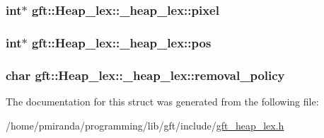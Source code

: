\subsubsection[{\texorpdfstring{pixel}{pixel}}]{\setlength{\rightskip}{0pt plus 5cm}int$\ast$ gft\+::\+Heap\+\_\+lex\+::\+\_\+heap\+\_\+lex\+::pixel}\hypertarget{structgft_1_1Heap__lex_1_1__heap__lex_ad0959c04c1544378684b566f6d2cbe8c}{}\label{structgft_1_1Heap__lex_1_1__heap__lex_ad0959c04c1544378684b566f6d2cbe8c}
\subsubsection[{\texorpdfstring{pos}{pos}}]{\setlength{\rightskip}{0pt plus 5cm}int$\ast$ gft\+::\+Heap\+\_\+lex\+::\+\_\+heap\+\_\+lex\+::pos}\hypertarget{structgft_1_1Heap__lex_1_1__heap__lex_a5930686532a650d25969bba672e88d35}{}\label{structgft_1_1Heap__lex_1_1__heap__lex_a5930686532a650d25969bba672e88d35}
\subsubsection[{\texorpdfstring{removal\+\_\+policy}{removal_policy}}]{\setlength{\rightskip}{0pt plus 5cm}char gft\+::\+Heap\+\_\+lex\+::\+\_\+heap\+\_\+lex\+::removal\+\_\+policy}\hypertarget{structgft_1_1Heap__lex_1_1__heap__lex_ae260010a97dcb6824b62a594d3477709}{}\label{structgft_1_1Heap__lex_1_1__heap__lex_ae260010a97dcb6824b62a594d3477709}


The documentation for this struct was generated from the following file\+:\begin{DoxyCompactItemize}
\item 
/home/pmiranda/programming/lib/gft/include/\hyperlink{gft__heap__lex_8h}{gft\+\_\+heap\+\_\+lex.\+h}\end{DoxyCompactItemize}
